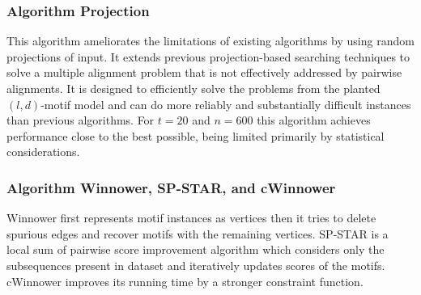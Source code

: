 \subsubsection{Algorithm Projection}
This algorithm ameliorates the limitations of existing algorithms by using random projections of input. It extends previous projection-based searching techniques to solve a multiple alignment problem that is not effectively addressed by pairwise alignments. It is designed to efficiently solve the problems from the planted $ (l, d) $-motif model and can do more reliably and substantially difficult instances than previous algorithms. For $ t= 20 $ and $ n= 600 $ this algorithm achieves performance close to the best possible, being limited primarily by statistical considerations.

\subsubsection{Algorithm Winnower, SP-STAR, and cWinnower}
Winnower first represents motif instances as vertices then it tries to delete spurious edges and recover motifs with the remaining vertices. SP-STAR is a local sum of pairwise score improvement algorithm which considers only the subsequences present in dataset and iteratively updates scores of the motifs. cWinnower improves its running time by a stronger constraint function.



\endinput


%
%
%
%
%				


